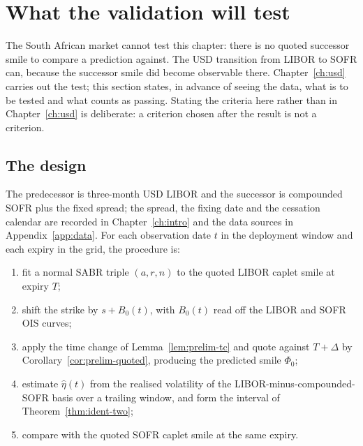 \documentclass[../../../main.tex]{subfiles}
\begin{document}

\section{What the validation will test}\label{sec:ident-validation}

The South African market cannot test this chapter: there is no quoted successor smile to compare a prediction against. The USD transition from LIBOR to SOFR can, because the successor smile did become observable there. Chapter~\ref{ch:usd} carries out the test; this section states, in advance of seeing the data, what is to be tested and what counts as passing. Stating the criteria here rather than in Chapter~\ref{ch:usd} is deliberate: a criterion chosen after the result is not a criterion.

\subsection{The design}

The predecessor is three-month USD LIBOR and the successor is compounded SOFR plus the fixed spread; the spread, the fixing date and the cessation calendar are recorded in Chapter~\ref{ch:intro} and the data sources in Appendix~\ref{app:data}. For each observation date $t$ in the deployment window and each expiry in the grid, the procedure is:
\begin{enumerate}[nosep,label=(\arabic*)]
\item fit a normal SABR triple $(a,r,n)$ to the quoted LIBOR caplet smile at expiry $T$;
\item shift the strike by $s+B_{0}(t)$, with $B_0(t)$ read off the LIBOR and SOFR OIS curves;
\item apply the time change of Lemma~\ref{lem:prelim-tc} and quote against $T+\Delta$ by Corollary~\ref{cor:prelim-quoted}, producing the predicted smile $\Phi_0$;
\item estimate $\hat\eta(t)$ from the realised volatility of the LIBOR-minus-compounded-SOFR basis over a trailing window, and form the interval of Theorem~\ref{thm:ident-two};
\item compare with the quoted SOFR caplet smile at the same expiry.
\end{enumerate}
\end{document}
